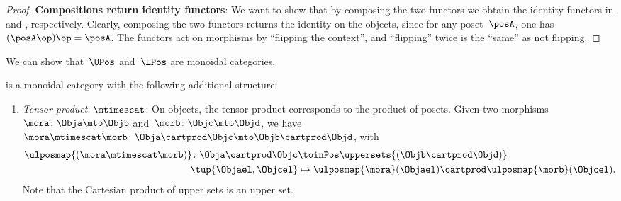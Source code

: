\begin{proof}
    \textbf{Compositions return identity functors}:
    We want to show that by composing the two functors we obtain the identity functors in \UPos and \LPos, respectively.
    Clearly, composing the two functors returns the identity on the objects, since for any poset~$\posA$, one has~$(\posA\op)\op=\posA$.
    The functors act on morphisms by ``flipping the context'', and ``flipping'' twice is the ``same'' as not flipping.
\end{proof}

We can show that~$\UPos$ and~$\LPos$ are monoidal categories.

\begin{lemma}
    \label{lem:upos_moncat}
    \UPos is a monoidal category with the following additional structure:
    \begin{enumerate}
        \item \emph{Tensor product~$\mtimescat$}: On objects, the tensor product corresponds to the product of posets.
              Given two morphisms~$\mora\colon \Obja\mto \Objb$ and~$\morb\colon \Objc\mto \Objd$, we have~$\mora \mtimescat \morb\colon  \Obja \cartprod \Objc \mto \Objb\cartprod \Objd$, with
              \begin{equation}
                  \begin{aligned}
                      \ulposmap{(\mora\mtimescat \morb)}\colon \Obja \cartprod \Objc & \toinPos \uppersets{(\Objb\cartprod \Objd)} \\
                      \tup{\Objael,\Objcel}                                          & \mapsto \ulposmap{\mora}(\Objael)\cartprod \ulposmap{\morb}(\Objcel).
                  \end{aligned}
              \end{equation}
              Note that the Cartesian product of upper sets is an upper set.


\end{enumerate}
\end{lemma}

